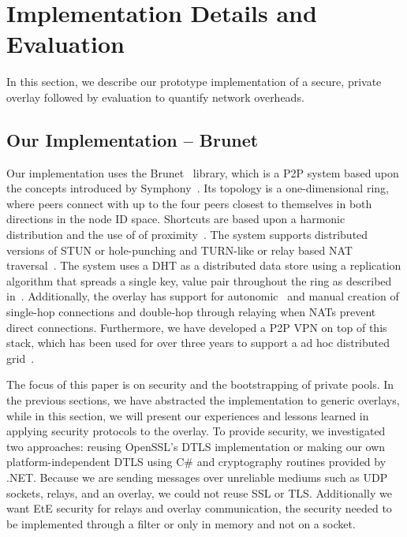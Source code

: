 \documentclass[conference]{IEEEtran}
\begin{document}
\section{Implementation Details and Evaluation}
\label{evaluations}
In this section, we describe our prototype implementation of a secure, private
overlay followed by evaluation to quantify network overheads.

\subsection{Our Implementation -- Brunet}
\label{implementation}
Our implementation uses the Brunet~\cite{brunet} library, which is a P2P system
based upon the concepts introduced by Symphony~\cite{symphony}.  Its topology is a
one-dimensional ring, where peers connect with up to the four peers closest
to themselves in both directions in the node ID space.  Shortcuts are based
upon a harmonic distribution and the use of of proximity~\cite{hpdc08_0}.  The
system supports distributed versions of STUN or hole-punching and TURN-like or
relay based NAT traversal~\cite{nsdi10}.  The system uses a DHT as a distributed
data store using a replication algorithm that spreads a single key, value pair
throughout the ring as described in~\cite{pcgrid07}.  Additionally, the overlay
has support for autonomic~\cite{wow} and manual creation of single-hop
connections and double-hop through relaying when NATs prevent direct
connections.  Furthermore, we have developed a P2P VPN on top of this stack,
which has been used for over three years to support a ad hoc distributed
grid~\cite{archer, gridappliance}.

The focus of this paper is on security and the bootstrapping of private pools.
In the previous sections, we have abstracted the implementation to generic
overlays, while in this section, we will present our experiences and lessons
learned in applying security protocols to the overlay.  To provide security, we
investigated two approaches:  reusing OpenSSL's DTLS implementation or making
our own platform-independent DTLS using C\# and cryptography routines provided
by .NET.  Because we are sending messages over unreliable mediums such as UDP
sockets, relays, and an overlay, we could not reuse SSL or TLS.  Additionally
we want EtE security for relays and overlay communication, the security needed
to be implemented through a filter or only in memory and not on a socket.
\end{document}
